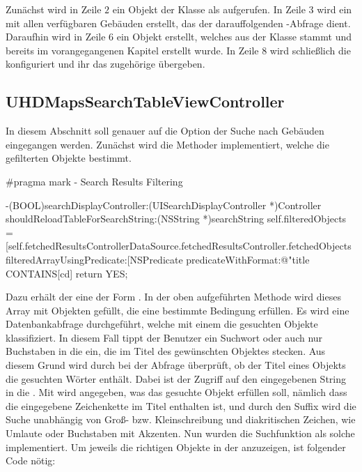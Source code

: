 \documentclass{report}
\begin{document}
Zunächst wird in Zeile $2$ ein Objekt der Klasse  als  aufgerufen. In Zeile $3$ wird ein  mit allen verfügbaren Gebäuden erstellt, das der darauffolgenden -Abfrage dient. Daraufhin wird in Zeile $6$ ein Objekt  erstellt, welches aus der Klasse  stammt und bereits im vorangegangenen Kapitel erstellt wurde. In Zeile $8$ wird schließlich die  konfiguriert und ihr das zugehörige  übergeben. 

\subsection{UHDMapsSearchTableViewController} \label{subsection_1}

In diesem Abschnitt soll genauer auf die Option der Suche nach Gebäuden eingegangen werden. Zunächst wird die Methoder  implementiert, welche die gefilterten Objekte bestimmt. 

\begin{objclst}
#pragma mark - Search Results Filtering

-(BOOL)searchDisplayController:(UISearchDisplayController *)Controller shouldReloadTableForSearchString:(NSString *)searchString
{    
    self.filteredObjects = [self.fetchedResultsControllerDataSource.fetchedResultsController.fetchedObjects filteredArrayUsingPredicate:[NSPredicate predicateWithFormat:@"title CONTAINS[cd] %
    return YES;
}
\end{objclst}

Dazu erhält der  eine  der Form . In der oben aufgeführten Methode wird dieses Array mit Objekten gefüllt, die eine bestimmte Bedingung erfüllen. Es wird eine Datenbankabfrage durchgeführt, welche mit einem  die gesuchten Objekte klassifiziert. In diesem Fall tippt der Benutzer ein Suchwort oder auch nur Buchstaben in die  ein, die im Titel des gewünschten Objektes stecken. Aus diesem Grund wird durch  bei der Abfrage überprüft, ob der Titel eines Objekts die gesuchten Wörter enthält. Dabei ist  der Zugriff auf den eingegebenen String in die . Mit  wird angegeben, was das gesuchte Objekt erfüllen soll, nämlich dass die eingegebene Zeichenkette im Titel enthalten ist, und durch den Suffix \objc{[cd]} wird die Suche unabhängig von Groß- bzw. Kleinschreibung und diakritischen Zeichen, wie Umlaute oder Buchstaben mit Akzenten. Nun wurden die Suchfunktion als solche implementiert. Um jeweils die richtigen Objekte in der  anzuzeigen, ist folgender Code nötig:
\end{document}
